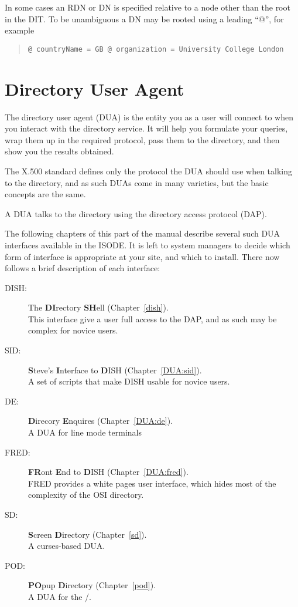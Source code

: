 In some cases an RDN or DN is specified relative to a node other than the
root in the DIT.
To be unambiguous a DN may be rooted using a leading ``@'', for example
\begin{quote}\small\begin{verbatim}
@ countryName = GB @ organization = University College London 
\end{verbatim}\end{quote}


\section{Directory User Agent}
The directory user agent (DUA) is the entity you as a user will
connect to when you interact with the directory service.
It will help you formulate your queries, wrap them up in the required
protocol, pass them to the
directory, and then show you the results obtained.

The X.500 standard defines only the protocol the DUA should use when talking
to the directory, and as such DUAs come in many varieties, but the basic
concepts are the same.

A DUA talks to the directory using the directory access protocol
(DAP).

The following chapters of this part of the manual describe several such
DUA interfaces available in the ISODE.  It is left to system
managers to decide which form of interface is appropriate at your
site, and which to install.  There now follows a brief description of
each interface:

\begin{description}
\item [DISH:]	The {\bf DI}rectory {\bf SH}ell 
		(Chapter~\ref{dish}).\\
		This interface give a user full access to the DAP, and
		as such may be complex for novice users.

\item [SID:]	{\bf S}teve's {\bf I}nterface to {\bf D}ISH 
		(Chapter~\ref{DUA:sid}).\\
		A set of scripts that make DISH usable for novice users.

\item [DE:]	{\bf D}irecory {\bf E}nquires
		(Chapter~\ref{DUA:de}).\\
		A DUA for line mode terminals

\item [FRED:]	{\bf FR}ont {\bf E}nd to {\bf D}ISH
		(Chapter~\ref{DUA:fred}).\\

		FRED provides a white pages user interface, which hides most
		of the complexity of the OSI directory.

\item [SD:]	{\bf S}creen {\bf D}irectory
		(Chapter~\ref{sd}).\\
		A curses-based DUA.

\item [POD:]	{\bf PO}pup {\bf D}irectory
		(Chapter~\ref{pod}).\\
		A DUA for the \xwindows/.

\end{description}


